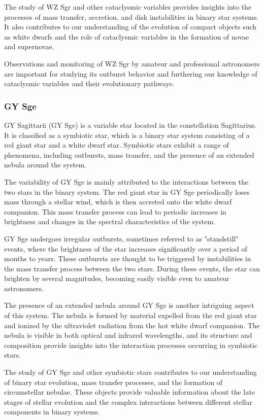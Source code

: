 The study of WZ Sgr and other cataclysmic variables provides insights into the processes of mass transfer, accretion, and disk instabilities in binary star systems. It also contributes to our understanding of the evolution of compact objects such as white dwarfs and the role of cataclysmic variables in the formation of novae and supernovae.

Observations and monitoring of WZ Sgr by amateur and professional astronomers are important for studying its outburst behavior and furthering our knowledge of cataclysmic variables and their evolutionary pathways.

\subsubsection*{ GY Sge }
GY Sagittarii (GY Sge) is a variable star located in the constellation Sagittarius. It is classified as a symbiotic star, which is a binary star system consisting of a red giant star and a white dwarf star. Symbiotic stars exhibit a range of phenomena, including outbursts, mass transfer, and the presence of an extended nebula around the system.

The variability of GY Sge is mainly attributed to the interactions between the two stars in the binary system. The red giant star in GY Sge periodically loses mass through a stellar wind, which is then accreted onto the white dwarf companion. This mass transfer process can lead to periodic increases in brightness and changes in the spectral characteristics of the system.

GY Sge undergoes irregular outbursts, sometimes referred to as "standstill" events, where the brightness of the star increases significantly over a period of months to years. These outbursts are thought to be triggered by instabilities in the mass transfer process between the two stars. During these events, the star can brighten by several magnitudes, becoming easily visible even to amateur astronomers.

The presence of an extended nebula around GY Sge is another intriguing aspect of this system. The nebula is formed by material expelled from the red giant star and ionized by the ultraviolet radiation from the hot white dwarf companion. The nebula is visible in both optical and infrared wavelengths, and its structure and composition provide insights into the interaction processes occurring in symbiotic stars.

The study of GY Sge and other symbiotic stars contributes to our understanding of binary star evolution, mass transfer processes, and the formation of circumstellar nebulae. These objects provide valuable information about the late stages of stellar evolution and the complex interactions between different stellar components in binary systems.


